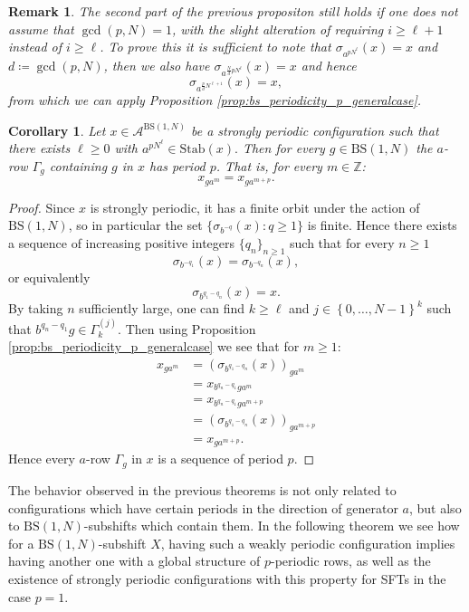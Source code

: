 \documentclass[letterpaper,10pt]{amsart}
\theoremstyle{plain}
\newtheorem{corollary}[theorem]{Corollary}
\newtheorem*{remark*}{Remark}
\newcommand{\BS}[1][N]{\mathrm{BS}(1,#1)}
\begin{document}
	\begin{remark*} The second part of the previous propositon still holds if one does not assume that $\gcd(p,N)=1$, with the slight alteration of requiring $i\ge \ell+1$ instead of $i\ge \ell$. To prove this it is sufficient to note that $\sigma_{a^{pN^\ell}}(x)=x$ and $d\coloneqq \gcd(p,N)$, then we also have $\sigma_{a^{\frac{N}{d}pN^\ell}}(x)=x$ and hence 
		$$
		\sigma_{a^{\frac{p}{d}N^{\ell+1}}}(x)=x,
		$$
		from which we can apply Proposition \ref{prop:bs_periodicity_p_generalcase}.
	\end{remark*}
	
	\begin{corollary} Let $x\in \mathcal{A}^{\BS}$ be a strongly periodic configuration such that there exists $\ell\ge 0$ with $a^{pN^{\ell}}\in \mathrm{Stab}(x).$ Then for every $g\in \BS$ the $a$-row $\Gamma_g$ containing $g$ in $x$ has period $p$. That is, for every $m\in \mathbb{Z}$:
		$$
		x_{ga^{m}}=x_{ga^{m+p}}.
		$$
	\end{corollary}
	\begin{proof}
		Since $x$ is strongly periodic, it has a finite orbit under the action of $\BS$, so in particular the set $\{ \sigma_{b^{-q}}(x): q\ge 1 \}$ is finite. Hence there exists a sequence of increasing positive integers $\{q_n\}_{n\ge 1}$ such that for every $n\ge1$
		$$
		\sigma_{b^{-q_1}}(x)=\sigma_{b^{-q_n}}(x),
		$$
		or equivalently
		$$
		\sigma_{b^{q_1-q_n}}(x)=x.
		$$
		By taking $n$ sufficiently large, one can find $k\ge \ell $ and $j\in\left\{0,\ldots,N-1\right\}^k$ such that $b^{q_n-q_1}g\in \Gamma_{k}^{(j)}$. Then using Proposition \ref{prop:bs_periodicity_p_generalcase} we see that for $m\ge 1:$
		\begin{equation*}
		\begin{aligned}
		x_{ga^{m}}&=(\sigma_{b^{q_1-q_n}}(x))_{ga^{m}} \\
		&=x_{b^{q_n-q_1}ga^{m}}\\
		&=x_{b^{q_n-q_1}ga^{m+p}} \\
		&=(\sigma_{b^{q_1-q_n}}(x))_{ga^{m+p}}\\
		&=x_{ga^{m+p}}.
		\end{aligned}
		\end{equation*}
		Hence every $a$-row $\Gamma_g$ in $x$ is a sequence of period $p$.
	\end{proof}
The behavior observed in the previous theorems is not only related to configurations which have certain periods in the direction of generator $a$, but also to $\BS$-subshifts which contain them. In the following theorem we see how for a $\BS$-subshift $X$, having such a weakly periodic configuration implies having another one with a global structure of $p$-periodic rows, as well as the existence of strongly periodic configurations with this property for SFTs in the case $p=1$.
\end{document}

